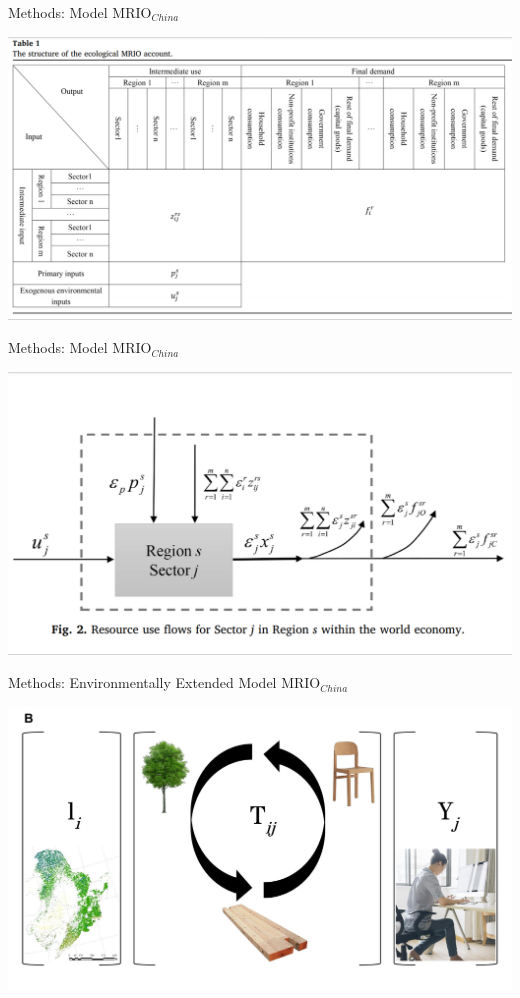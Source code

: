 \documentclass[ignorenonframetext,]{beamer}
\begin{document}
\begin{frame}{Methods: Model MRIO\(_{China}\)}
\protect\hypertarget{methods-model-mrio_china}{}

\begin{center}\includegraphics[width=0.5\linewidth]{images/Wu_2018_Table1} \end{center}

\end{frame}

\begin{frame}{Methods: Model MRIO\(_{China}\)}
\protect\hypertarget{methods-model-mrio_china-1}{}

\begin{center}\includegraphics[width=0.5\linewidth]{images/Wu_2018_Fig2} \end{center}

\end{frame}

\begin{frame}{Methods: Environmentally Extended Model MRIO\(_{China}\)}
\protect\hypertarget{methods-environmentally-extended-model-mrio_china}{}

\begin{center}\includegraphics[width=0.5\linewidth]{images/china_eemrio} \end{center}

\end{frame}
\end{document}

